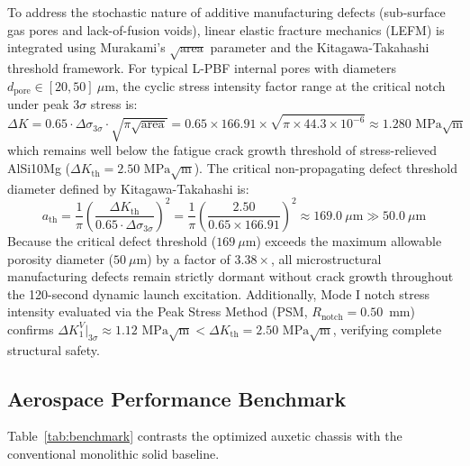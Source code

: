 \documentclass[preprint,12pt,3p]{elsarticle}
\begin{document}
To address the stochastic nature of additive manufacturing defects (sub-surface gas pores and lack-of-fusion voids), linear elastic fracture mechanics (LEFM) is integrated using Murakami's $\sqrt{\text{area}}$ parameter and the Kitagawa-Takahashi threshold framework. For typical L-PBF internal pores with diameters $d_{\text{pore}} \in [20, 50]\ \mu\text{m}$, the cyclic stress intensity factor range at the critical notch under peak $3\sigma$ stress is:
\begin{equation}
  \Delta K = 0.65 \cdot \Delta\sigma_{3\sigma} \cdot \sqrt{\pi \sqrt{\text{area}}} = 0.65 \times 166.91 \times \sqrt{\pi \times 44.3 \times 10^{-6}} \approx 1.280\text{ MPa}\sqrt{\text{m}}
\end{equation}
which remains well below the fatigue crack growth threshold of stress-relieved AlSi10Mg ($\Delta K_{\text{th}} = 2.50\text{ MPa}\sqrt{\text{m}}$). The critical non-propagating defect threshold diameter defined by Kitagawa-Takahashi is:
\begin{equation}
  a_{\text{th}} = \frac{1}{\pi} \left( \frac{\Delta K_{\text{th}}}{0.65 \cdot \Delta\sigma_{3\sigma}} \right)^2 = \frac{1}{\pi} \left( \frac{2.50}{0.65 \times 166.91} \right)^2 \approx 169.0\ \mu\text{m} \gg 50.0\ \mu\text{m}
\end{equation}
Because the critical defect threshold ($169\ \mu\text{m}$) exceeds the maximum allowable porosity diameter ($50\ \mu\text{m}$) by a factor of $3.38\times$, all microstructural manufacturing defects remain strictly dormant without crack growth throughout the 120-second dynamic launch excitation. Additionally, Mode I notch stress intensity evaluated via the Peak Stress Method (PSM, $R_{\text{notch}} = 0.50$~mm) confirms $\Delta K_1^V\big|_{3\sigma} \approx 1.12\text{ MPa}\sqrt{\text{m}} < \Delta K_{\text{th}} = 2.50\text{ MPa}\sqrt{\text{m}}$, verifying complete structural safety.

\subsection{Aerospace Performance Benchmark}
Table~\ref{tab:benchmark} contrasts the optimized auxetic chassis with the conventional monolithic solid baseline.
\end{document}
